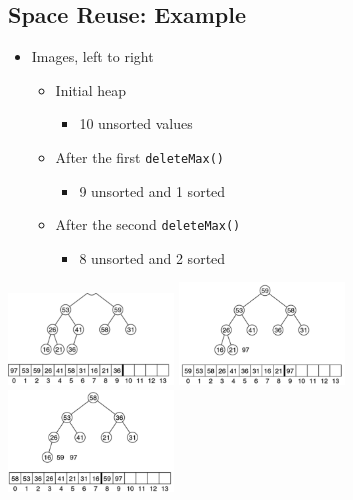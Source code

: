 \documentclass[
  10pt,
  english,
  letterpaper,
,tablecaptionabove
]{scrartcl}
\newcommand{\passthrough}[1]{#1}
\providecommand{\tightlist}{%
  \setlength{\itemsep}{0pt}\setlength{\parskip}{0pt}}
\begin{document}
\hypertarget{space-reuse-example}{%
\subsection{Space Reuse: Example}\label{space-reuse-example}}

\begin{itemize}
\tightlist
\item
  Images, left to right

  \begin{itemize}
  \tightlist
  \item
    Initial heap

    \begin{itemize}
    \tightlist
    \item
      10 unsorted values
    \end{itemize}
  \item
    After the first \passthrough{\lstinline!deleteMax()!}

    \begin{itemize}
    \tightlist
    \item
      9 unsorted and 1 sorted
    \end{itemize}
  \item
    After the second \passthrough{\lstinline!deleteMax()!}

    \begin{itemize}
    \tightlist
    \item
      8 unsorted and 2 sorted
    \end{itemize}
  \end{itemize}
\end{itemize}

\includegraphics[width=0.33\textwidth,height=\textheight]{images/1.png}
\includegraphics[width=0.33\textwidth,height=\textheight]{images/2.png}
\includegraphics[width=0.33\textwidth,height=\textheight]{images/3.png}
\end{document}
